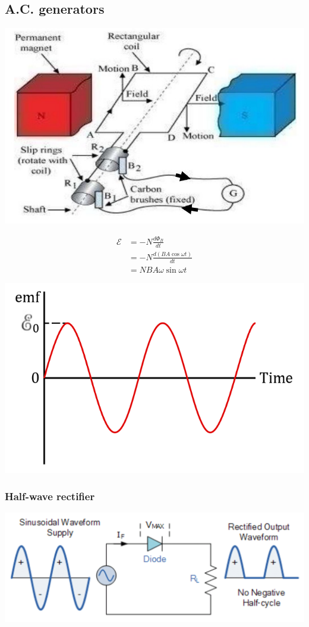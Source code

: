 \documentclass[11pt]{article}
\begin{document}
\subsection{A.C. generators}
\label{sec:orgfc0bf3e}
\begin{center}
\includegraphics[width=.9\linewidth]{./images/ac-generator.png}
\end{center}

\begin{align*}
\mathcal{E} &= -N \frac{d \Phi_B}{dt} \\
&= -N \frac{d(BA \cos \omega t)}{dt} \\
&= NBA \omega \sin \omega t
\end{align*}

\begin{center}
\includegraphics[scale=0.7]{./images/ac-generator-graph.png}
\end{center}
\subsubsection{Half-wave rectifier}
\label{sec:org5a057a8}
\begin{center}
\includegraphics[width=.9\linewidth]{./images/half-wave-rectifier.png}
\end{center}
\end{document}
